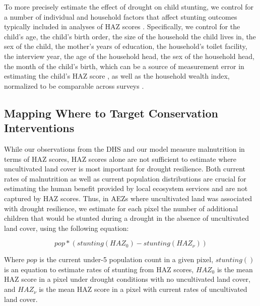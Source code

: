 \documentclass{article}
\begin{document}
To more precisely estimate the effect of drought on child stunting, we control for a number of individual and household factors that affect stunting outcomes typically included in analyses of HAZ scores \cite{brown2020empirical}.  Specifically, we control for the child's age, the child's birth order, the size of the household the child lives in, the sex of the child, the mother's years of education, the household's toilet facility, the interview year, the age of the household head, the sex of the household head, the month of the child's birth, which can be a source of measurement error in estimating the child's HAZ score \cite{larsen2019misreporting}, as well as the household wealth index, normalized to be comparable across surveys \cite{Rutstein2014c}.

\subsection{Mapping Where to Target Conservation Interventions}
While our observations from the DHS and our model measure malnutrition in terms of HAZ scores, HAZ scores alone are not sufficient to estimate where uncultivated land cover is most important for drought resilience.  Both current rates of malnutrition as well as current population distributions are crucial for estimating the human benefit provided by local ecosystem services and are not captured by HAZ scores.  Thus, in AEZs where uncultivated land was associated with drought resilience, we estimate for each pixel the number of additional children that would be stunted during a drought in the absence of uncultivated land cover, using the following equation:

\begin{equation}
  pop * (stunting(HAZ_{0}) - stunting(HAZ_{\nu})) \label{eqn:stunting}
\end{equation}

Where $pop$ is the current under-5 population count in a given pixel, $stunting()$ is an equation to estimate rates of stunting from HAZ scores, $HAZ_{0}$ is the mean HAZ score in a pixel under drought conditions with no uncultivated land cover, and $HAZ_{\nu}$ is the mean HAZ score in a pixel with current rates of uncultivated land cover.
\end{document}
